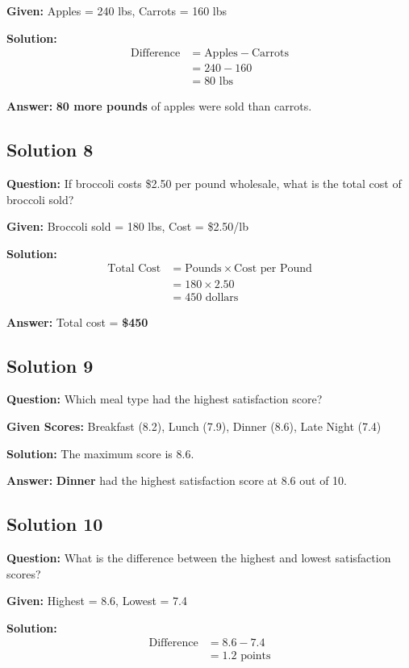 \documentclass[12pt,a4paper]{article}
\begin{document}
\textbf{Given:} Apples = 240 lbs, Carrots = 160 lbs

\textbf{Solution:}
\begin{align*}
\text{Difference} &= \text{Apples} - \text{Carrots} \\
&= 240 - 160 \\
&= 80 \text{ lbs}
\end{align*}

\textbf{Answer:} \textbf{80 more pounds} of apples were sold than carrots.

\subsection*{Solution 8}
\textbf{Question:} If broccoli costs \$2.50 per pound wholesale, what is the total cost of broccoli sold?

\textbf{Given:} Broccoli sold = 180 lbs, Cost = \$2.50/lb

\textbf{Solution:}
\begin{align*}
\text{Total Cost} &= \text{Pounds} \times \text{Cost per Pound} \\
&= 180 \times 2.50 \\
&= 450 \text{ dollars}
\end{align*}

\textbf{Answer:} Total cost = \textbf{\$450}

\subsection*{Solution 9}
\textbf{Question:} Which meal type had the highest satisfaction score?

\textbf{Given Scores:} Breakfast (8.2), Lunch (7.9), Dinner (8.6), Late Night (7.4)

\textbf{Solution:} The maximum score is 8.6.

\textbf{Answer:} \textbf{Dinner} had the highest satisfaction score at 8.6 out of 10.

\subsection*{Solution 10}
\textbf{Question:} What is the difference between the highest and lowest satisfaction scores?

\textbf{Given:} Highest = 8.6, Lowest = 7.4

\textbf{Solution:}
\begin{align*}
\text{Difference} &= 8.6 - 7.4 \\
&= 1.2 \text{ points}
\end{align*}
\end{document}
